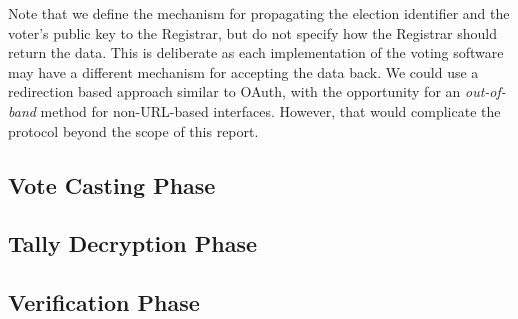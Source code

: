 Note that we define the mechanism for propagating the election identifier and the voter's public key to the Registrar, but do not specify how the Registrar should return the data. This is deliberate as each implementation of the voting software may have a different mechanism for accepting the data back. We could use a redirection based approach similar to OAuth, with the opportunity for an \emph{out-of-band} method for non-URL-based interfaces. However, that would complicate the protocol beyond the scope of this report.

\subsection{Vote Casting Phase}
\label{ch:astris:detail:vote}




\subsection{Tally Decryption Phase}
\label{ch:astris:detail:tally}

\subsection{Verification Phase}
\label{ch:astris:detail:verify}
